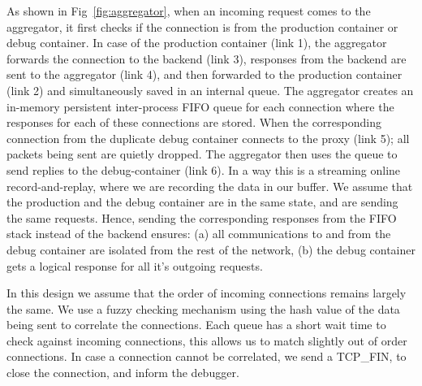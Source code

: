 As shown in  Fig~\ref{fig:aggregator}, when an incoming request comes to the aggregator, it first checks if the connection is from the production container or debug container. 
In case of the production container (link 1), the aggregator forwards the connection to the backend (link 3), responses from the backend are sent to the aggregator (link 4), and then forwarded to the production container (link 2) and simultaneously saved in an internal queue.
The aggregator creates an in-memory persistent inter-process FIFO queue for each connection where the responses for each of these connections are stored.
When the corresponding connection from the duplicate debug container connects to the proxy (link 5); all packets being sent are quietly dropped. 
The aggregator then uses the queue to send replies to the debug-container (link 6).
In a way this is a streaming online record-and-replay, where we are recording the data in our buffer.
We assume that the production and the debug container are in the same state, and are sending the same requests. 
Hence, sending the corresponding responses from the FIFO stack instead of the backend ensures: (a) all communications to and from the debug container are isolated from the rest of the network, (b) the debug container gets a logical response for all it's outgoing requests.

In this design we assume that the order of incoming connections remains largely the same.
We use a fuzzy checking mechanism using the hash value of the data being sent to correlate the connections. 
Each queue has a short wait time to check against incoming connections, this allows us to match slightly out of order connections.
In case a connection cannot be correlated, we send a TCP\_FIN, to close the connection, and inform the debugger.
